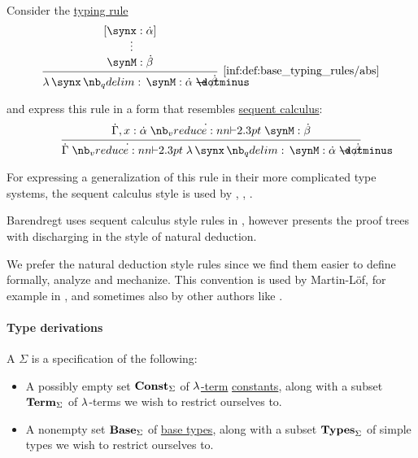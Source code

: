 \begin{remark}\label{rem:typing_rule_style}
  Consider the \hyperref[def:simple_typing_rule]{typing rule}
  \begin{equation*}
    \begin{prooftree}
      \hypo{ [\synx: \syn\alpha] }
      \ellipsis {} { \synM: \syn\beta }
      \infer1[\ref{inf:def:base_typing_rules/abs}]{ \qabs \synx \synM: \syn\alpha \synimplies \syn\beta }
    \end{prooftree}
  \end{equation*}

   and  express this rule in a form that resembles \hyperref[rem:sequent_calculus]{sequent calculus}:
  \begin{equation*}
    \begin{prooftree}
      \hypo{ \syn\Gamma, x: \syn\alpha \synvdash \synM: \syn\beta }
      \infer1{ \syn\Gamma \synvdash \qabs \synx \synM: \syn\alpha \synimplies \syn\beta }
    \end{prooftree}
  \end{equation*}

  For expressing a generalization of this rule in their more complicated type systems, the sequent calculus style is used by , , .

  Barendregt uses sequent calculus style rules in \cite[def. 3.1.3]{Barendregt1992Types}, however presents the proof trees with discharging in the style of natural deduction.

  We prefer the natural deduction style rules since we find them easier to define formally, analyze and mechanize. This convention is used by Martin-L\"of, for example in \cite{MartinLöf1984IntTypeTheory}, and sometimes also by other authors like .
\end{remark}

\paragraph{Type derivations}

\begin{definition}\label{def:simple_type_signature}\mimprovised
  A  \( \Sigma \) is a specification of the following:
  \begin{itemize}
    \item A possibly empty set \( \op*{Const}_\Sigma \) of \hyperref[def:lambda_term]{\( \mathrm{\lambda} \)-term} \hyperref[def:lambda_term/const]{constants}, along with a subset \( \op*{Term}_\Sigma \) of \( \mathrm{\lambda} \)-terms we wish to restrict ourselves to.

    \item A nonempty set \( \op*{Base}_\Sigma \) of \hyperref[def:simple_type]{base types}, along with a subset \( \op*{Types}_\Sigma \) of simple types we wish to restrict ourselves to.
  \end{itemize}
\end{definition}

